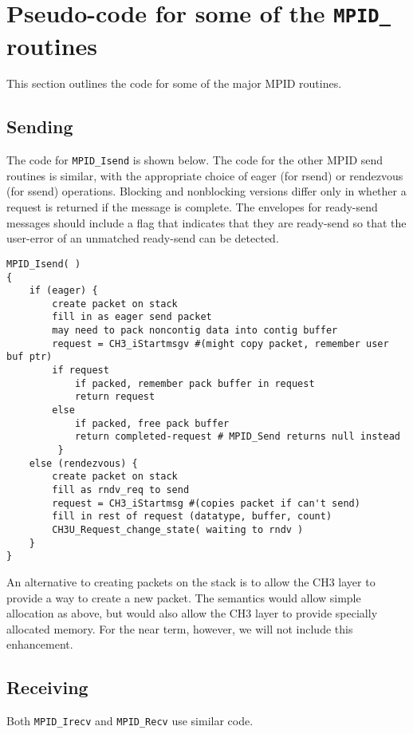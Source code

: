 \documentclass{article}
\def\code{\begingroup\makeustext\eatcode}
\def\eatcode#1{\texttt{#1}\endgroup}
\begin{document}

\section{Pseudo-code for some of the \code{MPID\_} routines}
This section outlines the code for some of the major MPID routines.

\subsection{Sending}
The code for \code{MPID_Isend} is shown below.  The code for the other
MPID send routines is similar, with the appropriate choice of eager
(for rsend) or rendezvous (for ssend) operations.  Blocking and
nonblocking versions differ only in whether a request is returned if
the message is complete.  The envelopes for ready-send messages should include
a flag that indicates that they are ready-send so that the user-error of an
unmatched ready-send can be detected.


\begin{verbatim}
MPID_Isend( )
{
    if (eager) {
        create packet on stack
        fill in as eager send packet
        may need to pack noncontig data into contig buffer
        request = CH3_iStartmsgv #(might copy packet, remember user buf ptr)
        if request
            if packed, remember pack buffer in request
            return request
        else 
            if packed, free pack buffer
            return completed-request # MPID_Send returns null instead
         }
    else (rendezvous) {
        create packet on stack
        fill as rndv_req to send
        request = CH3_iStartmsg #(copies packet if can't send)
        fill in rest of request (datatype, buffer, count)
        CH3U_Request_change_state( waiting to rndv )
    } 
}
\end{verbatim}

An alternative to creating packets on the stack is to allow the CH3 layer to
provide a way to create a new packet. The semantics would allow simple
allocation as above, but would also allow the CH3 layer to provide specially
allocated memory.  For the near term, however, we will not include this
enhancement. 

\subsection{Receiving}
Both \code{MPID_Irecv} and \code{MPID_Recv} use similar code.
\end{document}
